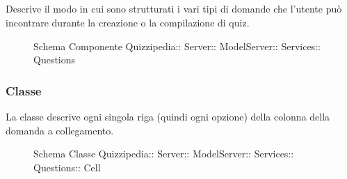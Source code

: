 \subsection{}
Descrive il modo in cui sono strutturati i vari tipi di domande che l'utente può incontrare durante la creazione o la compilazione di quiz.
\begin{figure}[H]
\centering
\noindent{}
\caption[Schema Componente Quizzipedia::Server::ModelServer::Services::Questions]{Schema Componente Quizzipedia:: Server:: ModelServer:: Services:: Questions}
\end{figure}
\subsubsection{Classe }
La classe descrive ogni singola riga (quindi ogni opzione) della colonna della domanda a collegamento.
\begin{figure}[H]
\centering
\noindent{}
\caption[Schema Classe Cell]{Schema Classe Quizzipedia:: Server:: ModelServer:: Services:: Questions:: Cell}
\end{figure}
